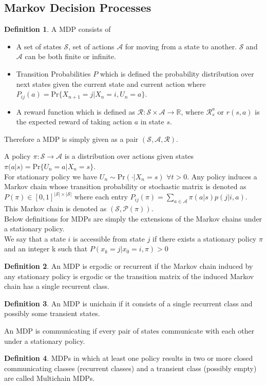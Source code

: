 \documentclass{article}
\theoremstyle{definition}
\newtheorem{definition}{Definition}[section]
\begin{document}
\subsection{Markov Decision Processes}
\begin{definition}
A MDP consists of 
\begin{itemize}
    \item A set of states $\mathcal{S}$, set of actions $\mathcal{A}$ for moving from a state to another. $\mathcal{S}$ and $\mathcal{A}$ can be both finite or infinite.
    \item Transition Probabilities $P$ which is defined the probability distribution over next states given the current state and current action where $P_{ij}(a) = \text{Pr}\{X_{n+1}=j|X_{n}=i,U_n=a\}$.
    \item A reward function which is defined as $\mathcal{R}: \mathcal{S}\times\mathcal{A}\rightarrow\mathbb{R}$, where $\mathcal{R}_s^a$ or $r(s,a)$ is the expected reward of taking action $a$ in state $s$.
\end{itemize} 

Therefore a MDP is simply given as a pair $(\mathcal{S},\mathcal{A},\mathcal{R})$.\\
\end{definition}
A policy $\pi:\mathcal{S}\rightarrow\mathcal{A}$ is a distribution over actions given states $\pi(a|s) = \text{Pr}\{U_n=a|X_n=s\}$. \\For stationary policy we have $U_n\sim \text{Pr}(\cdot|X_n=s)$ $\forall t>0$.\clearpage
Any policy induces a Markov chain whose transition probability or stochastic matrix is denoted as $P(\pi) \in [0,1]^{|\mathcal{S}|\times|\mathcal{S}|}$  where each entry $P_{ij}(\pi) = \sum_{a\in\mathcal{A}}\pi(a|s)p(j|i,a)$. This Markov chain is denoted as $(\mathcal{S},\mathcal{P}(\pi))$.\\

Below definitions for MDPs are simply the extensions of the Markov chains under a stationary policy. \\
We say that a state $i$ is accessible from state $j$ if there exists a stationary policy $\pi$ and an integer k such that $P(x_k=j|x_0=i,\pi)>0$
\begin{definition}
An MDP is ergodic or recurrent if the Markov chain induced by any stationary policy is ergodic or the transition matrix of the induced Markov chain has a single recurrent class.
\end{definition}
\begin{definition}
\label{def:unichain}
An MDP is unichain if it consists of a single recurrent class and possibly some transient states.
\end{definition}
An MDP is communicating if every pair of states communicate with each other under a stationary policy.
\begin{definition}
MDPs in which at least one policy results in two or more closed communicating classes (recurrent classes) and a transient class (possibly empty) are called Multichain
MDPs.
\end{definition}
\end{document}
